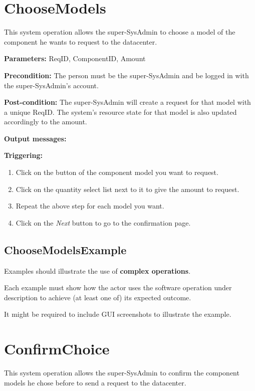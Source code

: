 \section{ChooseModels}
\label{operation:choosemodels}
This system operation allows the super-SysAdmin to choose a model of the
component he wants to request to the datacenter.

\begin{description}

\item \textbf{Parameters:} ReqID, ComponentID, Amount
\item \textbf{Precondition:} The person must be the super-SysAdmin and be logged
in with the super-SysAdmin's account.
\item \textbf{Post-condition:} The super-SysAdmin will create a request for that
model with a unique ReqID. The system's resource state for that model is also
updated accordingly to the amount.
\item \textbf{Output messages:}

\item \textbf{Triggering:}
\begin{enumerate}
\item Click on the button of the component model you want to request.
\item Click on the quantity select list next to it to give the amount to
request.
\item Repeat the above step for each model you want.
\item Click on the \emph{Next} button to go to the confirmation page.
\end{enumerate}

 
\end{description}

\subsection{ChooseModelsExample}
Examples should illustrate the use of \textbf{complex operations}.

Each example must show how the actor uses the software operation under
description to achieve (at least one of) its expected outcome.

It might be required to include GUI screenshots to illustrate the example.







\section{ConfirmChoice}
\label{operation:confirmchoice}
This system operation allows the super-SysAdmin to confirm the component models
he chose before to send a request to the datacenter.

